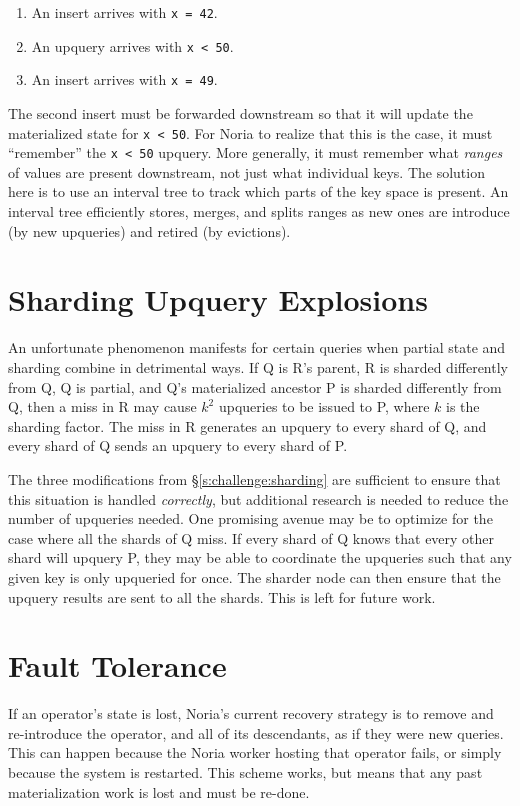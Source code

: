 \begin{enumerate}
  \item An insert arrives with \texttt{x = 42}.
  \item An upquery arrives with \texttt{x < 50}.
  \item An insert arrives with \texttt{x = 49}.
\end{enumerate}

The second insert must be forwarded downstream so that it will update the
materialized state for \texttt{x < 50}. For Noria to realize that this is the
case, it must ``remember'' the \texttt{x < 50} upquery. More generally, it must
remember what \emph{ranges} of values are present downstream, not just what
individual keys. The solution here is to use an interval tree to track which
parts of the key space is present. An interval tree efficiently stores, merges,
and splits ranges as new ones are introduce (by new upqueries) and retired (by
evictions).

\section{Sharding Upquery Explosions}

An unfortunate phenomenon manifests for certain queries when partial state and
sharding combine in detrimental ways. If Q is R's parent, R is sharded
differently from Q, Q is partial, and Q's materialized ancestor P is sharded
differently from Q, then a miss in R may cause $k^2$ upqueries to be issued to
P, where $k$ is the sharding factor. The miss in R generates an upquery to every
shard of Q, and every shard of Q sends an upquery to every shard of P.

The three modifications from \S\ref{s:challenge:sharding} are sufficient to
ensure that this situation is handled \emph{correctly}, but additional research
is needed to reduce the number of upqueries needed. One promising avenue may be
to optimize for the case where all the shards of Q miss. If every shard of Q
knows that every other shard will upquery P, they may be able to coordinate the
upqueries such that any given key is only upqueried for once. The sharder node
can then ensure that the upquery results are sent to all the shards. This is
left for future work.

\section{Fault Tolerance}

If an operator's state is lost, Noria's current recovery strategy is to remove
and re-introduce the operator, and all of its descendants, as if they were new
queries. This can happen because the Noria worker hosting that operator fails,
or simply because the system is restarted. This scheme works, but means that any
past materialization work is lost and must be re-done.

